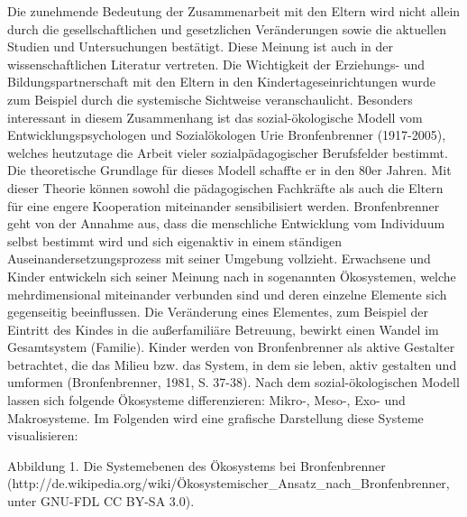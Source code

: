 \documentclass[12pt,a4paper]{article}
\begin{document}
Die zunehmende Bedeutung der Zusammenarbeit mit den Eltern wird nicht allein durch die gesellschaftlichen und gesetzlichen Veränderungen sowie die aktuellen Studien und Untersuchungen bestätigt. Diese Meinung ist auch in der wissenschaftlichen Literatur vertreten. Die Wichtigkeit der Erziehungs- und Bildungspartnerschaft mit den Eltern in den Kindertageseinrichtungen wurde zum Beispiel durch die systemische Sichtweise veranschaulicht. Besonders interessant in diesem Zusammenhang ist das sozial-ökologische Modell vom Entwicklungspsychologen und Sozialökologen Urie Bronfenbrenner (1917-2005), welches heutzutage die Arbeit vieler sozialpädagogischer Berufsfelder bestimmt. Die theoretische Grundlage für dieses Modell schaffte er in den 80er Jahren. Mit dieser Theorie können sowohl die pädagogischen Fachkräfte als auch die Eltern für eine engere Kooperation miteinander sensibilisiert werden. 
	Bronfenbrenner geht von der Annahme aus, dass die menschliche Entwicklung vom Individuum selbst bestimmt wird und sich eigenaktiv in einem ständigen Auseinandersetzungsprozess mit seiner Umgebung vollzieht. Erwachsene und Kinder entwickeln sich seiner Meinung nach in sogenannten Ökosystemen, welche mehrdimensional miteinander verbunden sind und deren einzelne Elemente sich gegenseitig beeinflussen. Die Veränderung eines Elementes, zum Beispiel der Eintritt des Kindes in die außerfamiliäre Betreuung, bewirkt einen Wandel im Gesamtsystem (Familie). Kinder werden von Bronfenbrenner als aktive Gestalter betrachtet, die das Milieu bzw. das System, in dem sie leben, aktiv gestalten und umformen (Bronfenbrenner, 1981, S. 37-38). 
Nach dem sozial-ökologischen Modell lassen sich folgende Ökosysteme differenzieren: Mikro-, Meso-, Exo- und Makrosysteme. Im Folgenden wird eine grafische Darstellung diese Systeme visualisieren:


Abbildung 1. Die Systemebenen des Ökosystems bei Bronfenbrenner (http://de.wikipedia.org/wiki/Ökosystemischer_Ansatz_nach_Bronfenbrenner, unter GNU-FDL CC BY-SA 3.0).
 
\end{document}
